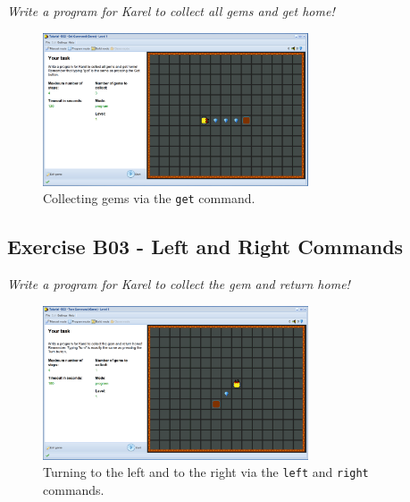 \documentclass[article,A4,12pt]{llncs}
\begin{document}
{\em Write a program for Karel to collect all gems and get home! 

\begin{figure}[!ht]
\begin{center}
\includegraphics[width=0.7\textwidth]{img/b02.png}
\end{center}
\vspace{-4mm}
\caption{Collecting gems via the {\tt get} command.}
\label{fig:b02}
\vspace{-4mm}
\end{figure}
\noindent

\newpage

\subsection{Exercise B03 - Left and Right Commands}

{\em Write a program for Karel to collect the gem and return home! 

\begin{figure}[!ht]
\begin{center}
\includegraphics[width=0.7\textwidth]{img/b03.png}
\end{center}
\vspace{-4mm}
\caption{Turning to the left and to the right via the {\tt left} and {\tt right} commands.}
\label{fig:b03}
\vspace{-4mm}
\end{figure}
\noindent

}}
\end{document}
